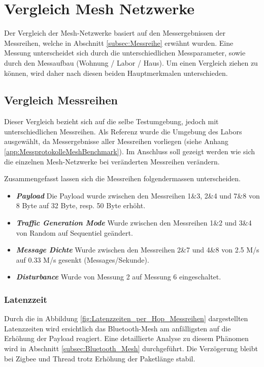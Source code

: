 \clearpage

\section{Vergleich Mesh Netzwerke}\label{sec:VergleichMeshNetzwerke}
Der Vergleich der Mesh-Netzwerke basiert auf den Messergebnissen der Messreihen, welche in Abschnitt \ref{subsec:Messreihe} erwähnt wurden. Eine Messung unterscheidet sich durch die unterschiedlichen Messparameter, sowie durch den Messaufbau (Wohnung / Labor / Haus). Um einen Vergleich ziehen zu können, wird daher nach diesen beiden Hauptmerkmalen unterschieden.


\subsection{Vergleich Messreihen}\label{subsec:VergleichMessreihen}

Dieser Vergleich bezieht sich auf die selbe Testumgebung, jedoch mit unterschiedlichen Messreihen. Als Referenz wurde die Umgebung des Labors ausgewählt, da Messergebnisse aller Messreihen vorliegen (siehe Anhang \ref{app:MessprotokolleMeshBenchmark}). Im Anschluss soll gezeigt werden wie sich die einzelnen Mesh-Netzwerke bei veränderten Messreihen verändern.

Zusammengefasst lassen sich die Messreihen folgendermassen unterscheiden. 

\begin{itemize}
	\item \textbf{\textit{Payload}} Die Payload wurde zwischen den Messreihen 1\&3, 2\&4 und 7\&8 von 8 Byte auf 32 Byte, resp. 50 Byte erhöht.
	\item \textbf{\textit{Traffic Generation Mode}} Wurde zwischen den Messreihen 1\&2 und 3\&4 von Random auf Sequentiel geändert.
	\item \textbf{\textit{Message Dichte}} Wurde zwischen den Messreihen 2\&7 und 4\&8 von 2.5 M/s auf 0.33 M/s gesenkt (Messages/Sekunde).
	\item \textbf{\textit{Disturbance}} Wurde von Messung 2 auf Messung 6 eingeschaltet.
\end{itemize}

\subsubsection{Latenzzeit}\label{subsec:VergleichLatenzzeitMessreihen}
Durch die in Abbildung \ref{fig:Latenzzeiten_per_Hop_Messreihen} dargestellten Latenzzeiten wird ersichtlich das Bluetooth-Mesh am anfälligsten auf die Erhöhung der Payload reagiert. Eine detaillierte Analyse zu diesem Phänomen wird in Abschnitt \ref{subsec:Bluetooth_Mesh} durchgeführt. Die Verzögerung bleibt bei Zigbee und Thread trotz Erhöhung der Paketlänge stabil.

